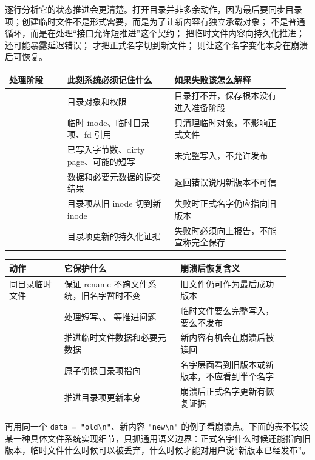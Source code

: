 逐行分析它的状态推进会更清楚。打开目录并非多余动作，因为最后要同步目录项；创建临时文件不是形式需要，而是为了让新内容有独立承载对象； 不是普通循环，而是在处理“接口允许短推进”这个契约； 把临时文件内容向持久化推进； 还可能暴露延迟错误； 才把正式名字切到新文件； 则让这个名字变化本身在崩溃后可恢复。

\begin{longtable}{|L{0.19\linewidth}|L{0.35\linewidth}|L{0.38\linewidth}|}
\toprule
处理阶段 & 此刻系统必须记住什么 & 如果失败该怎么解释 \\
\midrule
{} & 目录对象和权限 & 目录打不开，保存根本没有进入准备阶段 \\\tablerowrule
{} & 临时 inode、临时目录项、fd 引用 & 只清理临时对象，不影响正式文件 \\\tablerowrule
{} & 已写入字节数、dirty page、可能的短写 & 未完整写入，不允许发布 \\\tablerowrule
{} & 数据和必要元数据的提交结果 & 返回错误说明新版本不可信 \\\tablerowrule
{} & 目录项从旧 inode 切到新 inode & 失败时正式名字仍应指向旧版本 \\\tablerowrule
{} & 目录项更新的持久化证据 & 失败时必须向上报告，不能宣称完全保存 \\
\bottomrule
\end{longtable}

\begin{longtable}{|L{0.18\linewidth}|L{0.38\linewidth}|L{0.36\linewidth}|}
\toprule
动作 & 它保护什么 & 崩溃后恢复含义 \\
\midrule
同目录临时文件 & 保证 rename 不跨文件系统，旧名字暂时不变 & 旧文件仍可作为最后成功版本 \\\tablerowrule
{} & 处理短写、、 等推进问题 & 临时文件要么完整写入，要么不发布 \\\tablerowrule
{} & 推进临时文件数据和必要元数据 & 新内容有机会在崩溃后被读回 \\\tablerowrule
{} & 原子切换目录项指向 & 名字层面看到旧版本或新版本，不应看到半个名字 \\\tablerowrule
{} & 推进目录项更新本身 & 崩溃后正式名字更新有恢复证据 \\
\bottomrule
\end{longtable}

再用同一个 \verb|data = "old\n"|、新内容 \verb|"new\n"| 的例子看崩溃点。下面的表不假设某一种具体文件系统实现细节，只抓通用语义边界：正式名字什么时候还能指向旧版本，临时文件什么时候可以被丢弃，什么时候才能对用户说“新版本已经发布”。

